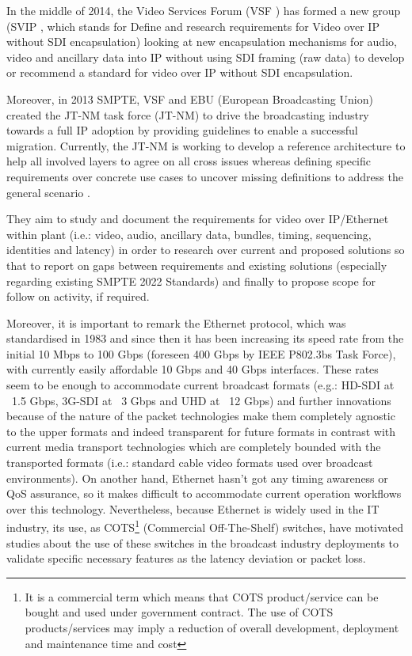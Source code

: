 In the middle of 2014, the Video Services Forum (VSF \cite{VSF}) has formed a new group (SVIP \cite{SVIP}, which stands for Define and research requirements for Video over IP without SDI encapsulation) looking at new encapsulation mechanisms for audio, video and ancillary data into IP without using SDI framing (raw data) to develop or recommend a standard for video over IP without SDI encapsulation.

Moreover, in 2013 SMPTE, VSF and EBU (European Broadcasting Union) created the JT-NM task force (JT-NM) to drive the broadcasting industry towards a full IP adoption by providing guidelines to enable a successful migration. Currently, the JT-NM is working to develop a reference architecture to help all involved layers to agree on all cross issues whereas defining specific requirements over concrete use cases to uncover missing definitions to address the general scenario \cite{jtnm}.

They aim to study and document the requirements for video over IP/Ethernet within plant (i.e.: video, audio, ancillary data, bundles, timing, sequencing, identities and latency) in order to research over current and proposed solutions so that to report on gaps between requirements and existing solutions (especially regarding existing SMPTE 2022 Standards) and finally to propose scope for follow on activity, if required.

Moreover, it is important to remark the Ethernet \cite{eth} protocol, which was standardised in 1983 and since then it has been increasing its speed rate from the initial 10 Mbps to 100 Gbps (foreseen 400 Gbps by IEEE P802.3bs \cite{ethbs} Task Force), with currently easily affordable 10 Gbps and 40 Gbps interfaces. These rates seem to be enough to accommodate current broadcast formats (e.g.: HD-SDI at ~1.5 Gbps, 3G-SDI at ~3 Gbps and UHD at ~12 Gbps) and further innovations because of the nature of the packet technologies make them completely agnostic to the upper formats and indeed transparent for future formats in contrast with current media transport technologies which are completely bounded with the transported formats (i.e.: standard cable video formats used over broadcast environments). On another hand, Ethernet hasn't got any timing awareness or QoS assurance, so it makes difficult to accommodate current operation workflows over this technology. Nevertheless, because Ethernet is widely used in the IT industry, its use, as COTS\footnote{It is a commercial term which means that COTS product/service can be bought and used under government contract. The use of COTS products/services may imply a reduction of overall development, deployment and maintenance time and cost} (Commercial Off-The-Shelf) switches, have motivated studies about the use of these switches in the broadcast industry deployments to validate specific necessary features as the latency deviation or packet loss.

